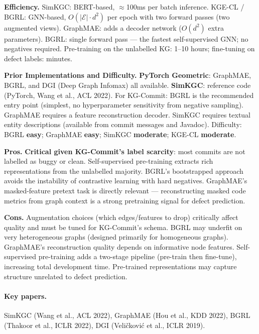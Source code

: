 \documentclass[12pt,a4paper]{article}
\begin{document}
\begin{effbox}
\textbf{Efficiency.}
SimKGC: BERT-based, $\approx$100ms per batch inference. KGE-CL / BGRL:
GNN-based, $O(|\mathcal{E}| \cdot d^2)$ per epoch with two forward passes
(two augmented views). GraphMAE: adds a decoder network ($O(d^2)$ extra
parameters). BGRL: single forward pass --- the fastest self-supervised GNN;
no negatives required. Pre-training on the unlabelled KG: 1--10 hours;
fine-tuning on defect labels: minutes.
\end{effbox}

\begin{implbox}
\textbf{Prior Implementations and Difficulty.}
\textbf{PyTorch Geometric}: GraphMAE, BGRL, and DGI (Deep Graph Infomax)
all available. \textbf{SimKGC}: reference code (PyTorch, Wang et al., ACL 2022).
For KG-Commit: BGRL is the recommended entry point (simplest, no hyperparameter
sensitivity from negative sampling). GraphMAE requires a feature reconstruction
decoder. SimKGC requires textual entity descriptions (available from commit
messages and Javadoc). Difficulty: BGRL \textbf{easy}; GraphMAE \textbf{easy};
SimKGC \textbf{moderate}; KGE-CL \textbf{moderate}.
\end{implbox}

\begin{prosbox}
\textbf{Pros.}
\textbf{Critical given KG-Commit's label scarcity}: most commits are not
labelled as buggy or clean. Self-supervised pre-training extracts rich
representations from the unlabelled majority. BGRL's bootstrapped approach
avoids the instability of contrastive learning with hard negatives. GraphMAE's
masked-feature pretext task is directly relevant --- reconstructing masked code
metrics from graph context is a strong pretraining signal for defect prediction.
\end{prosbox}

\begin{consbox}
\textbf{Cons.}
Augmentation choices (which edges/features to drop) critically affect quality
and must be tuned for KG-Commit's schema. BGRL may underfit on very
heterogeneous graphs (designed primarily for homogeneous graphs). GraphMAE's
reconstruction quality depends on informative node features. Self-supervised
pre-training adds a two-stage pipeline (pre-train then fine-tune), increasing
total development time. Pre-trained representations may capture structure
unrelated to defect prediction.
\end{consbox}

\paragraph{Key papers.} SimKGC (Wang et al., ACL 2022), GraphMAE (Hou et al.,
KDD 2022), BGRL (Thakoor et al., ICLR 2022), DGI (Veli\v{c}kovi\'{c} et al.,
ICLR 2019).
\end{document}
